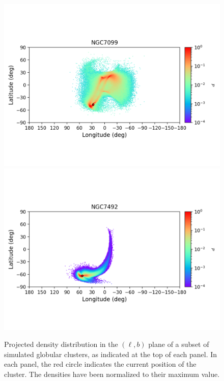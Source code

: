 \begin{figure}
\begin{center}
                \includegraphics[clip=true, trim = 0mm 20mm 0mm 10mm, width=1\columnwidth]{images/error_plots_NGC7099.png}
                \includegraphics[clip=true, trim = 0mm 20mm 0mm 10mm, width=1\columnwidth]{images/error_plots_NGC7492.png}
            \end{center}
            \caption[]{Projected density distribution in the $(\ell, b)$ plane of a subset of simulated globular clusters, as indicated at the top of each panel. In each panel, the red circle indicates the current position of the cluster. The densities have been normalized to their maximum value.}\label{stream16}
        \end{figure}
        
